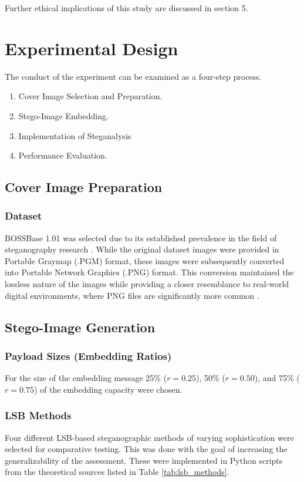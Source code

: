 Further ethical implications of this study are discussed in section 5.

\section{Experimental Design}

The conduct of the experiment can be examined as a four-step process.

\begin{enumerate}
  \item Cover Image Selection and Preparation.
  \item Stego-Image Embedding.
  \item Implementation of Steganalysis
  \item Performance Evaluation.
\end{enumerate}


\subsection{Cover Image Preparation}
\subsubsection{Dataset}

BOSSBase 1.01 was selected due to its established prevalence in the field of steganography research \cite{Sedighi2016}. 
While the original dataset images were provided in Portable Graymap (.PGM) format, these images were subsequently converted into Portable Network Graphics (.PNG) format. 
This conversion maintained the lossless nature of the images while providing a closer resemblance to real-world digital environments, where PNG files are significantly more common \cite{QSuccess2025}.


\subsection{Stego-Image Generation}
\subsubsection{Payload Sizes (Embedding Ratios)}

For the size of the embedding message 25\% ($r=0.25$), 50\% ($r=0.50$), and 75\% ($r=0.75$) of the embedding capacity were chosen. 

\subsubsection{LSB Methods}
Four different LSB-based steganographic methods of varying sophistication were selected for comparative testing. 
This was done with the goal of increasing the generalizability of the assessment. 
These were implemented in Python scripts from the theoretical sources listed in Table \ref{tab:lsb_methods}.

